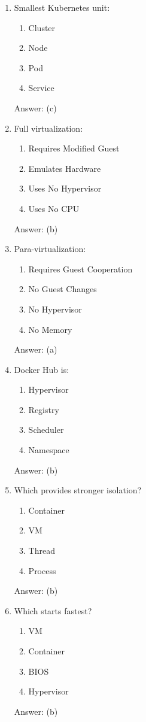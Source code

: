 \begin{enumerate}
\item Smallest Kubernetes unit:
\begin{enumerate}[label=(\alph*)]
\item Cluster
\item Node
\item Pod
\item Service
\end{enumerate}
Answer: (c)

\item Full virtualization:
\begin{enumerate}[label=(\alph*)]
\item Requires Modified Guest
\item Emulates Hardware
\item Uses No Hypervisor
\item Uses No CPU
\end{enumerate}
Answer: (b)

\item Para-virtualization:
\begin{enumerate}[label=(\alph*)]
\item Requires Guest Cooperation
\item No Guest Changes
\item No Hypervisor
\item No Memory
\end{enumerate}
Answer: (a)

\item Docker Hub is:
\begin{enumerate}[label=(\alph*)]
\item Hypervisor
\item Registry
\item Scheduler
\item Namespace
\end{enumerate}
Answer: (b)

\item Which provides stronger isolation?
\begin{enumerate}[label=(\alph*)]
\item Container
\item VM
\item Thread
\item Process
\end{enumerate}
Answer: (b)

\item Which starts fastest?
\begin{enumerate}[label=(\alph*)]
\item VM
\item Container
\item BIOS
\item Hypervisor
\end{enumerate}
Answer: (b)


\end{enumerate}
